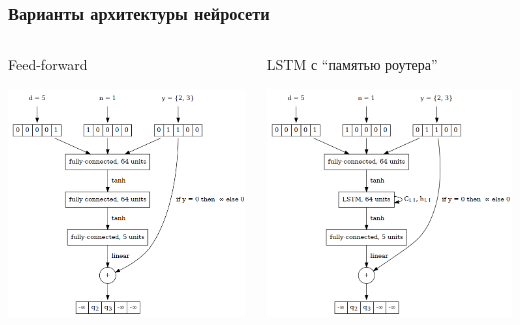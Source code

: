 \documentclass{beamer}
\begin{document}
\begin{frame}
  \frametitle{Варианты архитектуры нейросети}
  \fontsize{6pt}{7.2}\selectfont
  \begin{columns}
    \begin{column}{0.3\textwidth}
      Feed-forward
      \begin{center}
        \includegraphics[width=\textwidth]{nn-1}
      \end{center}
    \end{column}
    \begin{column}{0.3\textwidth}
      LSTM с ``памятью роутера''
      \begin{center}
        \includegraphics[width=\textwidth]{nn-3}

\end{center}
\end{column}
\end{columns}
\end{frame}
\end{document}
